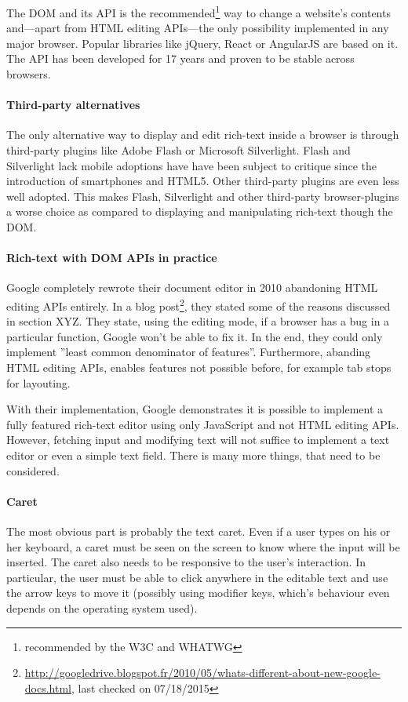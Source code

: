 The DOM and its API is the recommended\footnote{recommended by the W3C and WHATWG} way to change a website's contents and---apart from HTML editing APIs---the only possibility implemented in any major browser. Popular libraries like jQuery, React or AngularJS are based on it. The API has been developed for 17 years and proven to be stable across browsers.

\paragraph{Third-party alternatives} The only alternative way to display and edit rich-text inside a browser is through third-party plugins like Adobe Flash or Microsoft Silverlight. Flash and Silverlight lack mobile adoptions have have been subject to critique since the introduction of smartphones and HTML5. Other third-party plugins are even less well adopted. This makes Flash, Silverlight and other third-party browser-plugins a worse choice as compared to displaying and manipulating rich-text though the DOM.

\paragraph{Rich-text with DOM APIs in practice} Google completely rewrote their document editor in 2010 abandoning HTML editing APIs entirely. In a blog post\footnote{\url{http://googledrive.blogspot.fr/2010/05/whats-different-about-new-google-docs.html}, last checked on 07/18/2015}, they stated some of the reasons discussed in section XYZ. They state, using the editing mode, if a browser has a bug in a particular function, Google won't be able to fix it. In the end, they could only implement ''least common denominator of features''. Furthermore, abanding HTML editing APIs, enables features not possible before, for example tab stops for layouting. 

With their implementation, Google demonstrates it is possible to implement a fully featured rich-text editor using only JavaScript and not HTML editing APIs. However, fetching input and modifying text will not suffice to implement a text editor or even a simple text field. There is many more things, that need to be considered. 

\paragraph{Caret} The most obvious part is probably the text caret. Even if a user types on his or her keyboard, a caret must be seen on the screen to know where the input will be inserted. The caret also needs to be responsive to the user's interaction. In particular, the user must be able to click anywhere in the editable text and use the arrow keys to move it (possibly using modifier keys, which's behaviour even depends on the operating system used).

